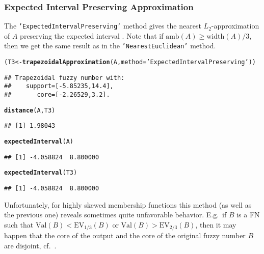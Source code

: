 \documentclass[11pt]{article}\usepackage{graphicx, color}
\makeatletter
\newcommand{\hlfunctioncall}[1]{\textcolor[rgb]{0.501960784313725,0,0.329411764705882}{\textbf{#1}}}%
\newcommand{\hlstring}[1]{\textcolor[rgb]{0.6,0.6,1}{#1}}%
\newenvironment{kframe}{%
 \def\at@end@of@kframe{}%
 \ifinner\ifhmode%
  \def\at@end@of@kframe{\end{minipage}}%
  \begin{minipage}{\columnwidth}%
 \fi\fi%
 \def\FrameCommand##1{\hskip\@totalleftmargin \hskip-\fboxsep
 \colorbox{shadecolor}{##1}\hskip-\fboxsep
     \hskip-\linewidth \hskip-\@totalleftmargin \hskip\columnwidth}%
 \MakeFramed {\advance\hsize-\width
   \@totalleftmargin\z@ \linewidth\hsize
   \@setminipage}}%
 {\par\unskip\endMakeFramed%
 \at@end@of@kframe}
\newenvironment{knitrout}{}{} %
\makeatother
\begin{document}
\subsubsection{Expected Interval Preserving Approximation}


The \texttt{'ExpectedIntervalPreserving'} method
gives the nearest $L_2$-approximation of $A$
preserving the expected interval \cite{Ban2008,Grzegorzewski2010,Yeh2008}.
Note that if $\mathrm{amb}(A) \ge \mathrm{width}(A)/3$, then
we get the same result as in
the \texttt{'NearestEuclidean'} method.


\begin{knitrout}\small
{}\color{fgcolor}\begin{kframe}
\begin{alltt}
(T3 <- \hlfunctioncall{trapezoidalApproximation}(A, method=\hlstring{'ExpectedIntervalPreserving'}))
\end{alltt}
\begin{verbatim}
## Trapezoidal fuzzy number with:
##    support=[-5.85235,14.4],
##       core=[-2.26529,3.2].
\end{verbatim}
\begin{alltt}
\hlfunctioncall{distance}(A, T3)
\end{alltt}
\begin{verbatim}
## [1] 1.98043
\end{verbatim}
\begin{alltt}
\hlfunctioncall{expectedInterval}(A)
\end{alltt}
\begin{verbatim}
## [1] -4.058824  8.800000
\end{verbatim}
\begin{alltt}
\hlfunctioncall{expectedInterval}(T3)
\end{alltt}
\begin{verbatim}
## [1] -4.058824  8.800000
\end{verbatim}
\end{kframe}
\end{knitrout}





Unfortunately, for highly skewed membership functions this method
(as well as the previous one) reveals sometimes quite unfavorable
behavior. E.g.~if $B$ is a FN such that
$\mathrm{Val}(B) < \mathrm{EV}_{1/3}(B)$
or $\mathrm{Val}(B) > \mathrm{EV}_{2/3}(B)$,
then it may happen that the core of the output
and the core of the original fuzzy number $B$ are disjoint,
cf.~\cite{GrzegorzewskiPasternak2011}.
\end{document}
